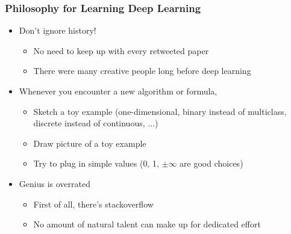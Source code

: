 \documentclass[10pt,mathserif]{beamer}
\begin{document}
\begin{frame}
  \frametitle{Philosophy for Learning Deep Learning}
  \begin{itemize}
  \item Don't ignore history!
    \begin{itemize}
    \item No need to keep up with every retweeted paper
    \item There were many creative people long before deep learning
    \end{itemize}
  \item Whenever you encounter a new algorithm or formula,
    \begin{itemize}
    \item Sketch a toy example (one-dimensional, binary instead of multiclass,
      discrete instead of continuous, ...)
    \item Draw picture of a toy example
    \item Try to plug in simple values (0, 1, $\pm \infty$ are good choices)
    \end{itemize}
  \item Genius is overrated
    \begin{itemize}
    \item First of all, there's stackoverflow
    \item No amount of natural talent can make up for dedicated effort
    \end{itemize}
  \end{itemize}
\end{frame}


\end{document}
